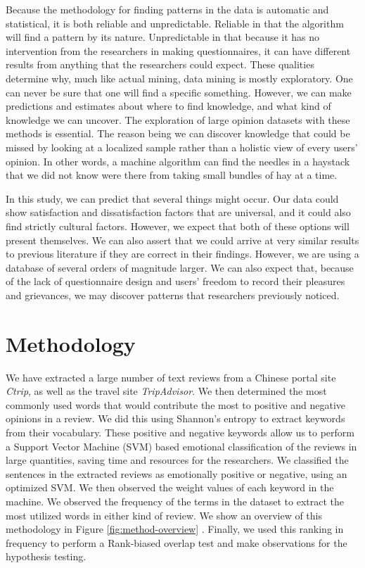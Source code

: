 \documentclass[smallextended,natbib]{svjour3}       %
\begin{document}
    Because the methodology for finding patterns in the data is automatic and statistical, it is both reliable and unpredictable. Reliable in that the algorithm will find a pattern by its nature. Unpredictable in that because it has no intervention from the researchers in making questionnaires, it can have different results from anything that the researchers could expect. These qualities determine why, much like actual mining, data mining is mostly exploratory. One can never be sure that one will find a specific something. However, we can make predictions and estimates about where to find knowledge, and what kind of knowledge we can uncover. The exploration of large opinion datasets with these methods is essential. The reason being we can discover knowledge that could be missed by looking at a localized sample rather than a holistic view of every users' opinion. In other words, a machine algorithm can find the needles in a haystack that we did not know were there from taking small bundles of hay at a time.

    In this study, we can predict that several things might occur. Our data could show satisfaction and dissatisfaction factors that are universal, and it could also find strictly cultural factors. However, we expect that both of these options will present themselves. We can also assert that we could arrive at very similar results to previous literature if they are correct in their findings. However, we are using a database of several orders of magnitude larger. We can also expect that, because of the lack of questionnaire design and users' freedom to record their pleasures and grievances, we may discover patterns that researchers previously noticed.


\section{Methodology}\label{method}

  We have extracted a large number of text reviews from a Chinese portal site \textit{Ctrip}, as well as the travel site \textit{TripAdvisor}. We then determined the most commonly used words that would contribute the most to positive and negative opinions in a review. We did this using Shannon's entropy to extract keywords from their vocabulary. These positive and negative keywords allow us to perform a Support Vector Machine (SVM) based emotional classification of the reviews in large quantities, saving time and resources for the researchers. We classified the sentences in the extracted reviews as emotionally positive or negative, using an optimized SVM. We then observed the weight values of each keyword in the machine. We observed the frequency of the terms in the dataset to extract the most utilized words in either kind of review. We show an overview of this methodology in Figure \ref{fig:method-overview} \cite[][]{Aleman2018ICAROB}. Finally, we used this ranking in frequency to perform a Rank-biased overlap test and make observations for the hypothesis testing.
\end{document}
